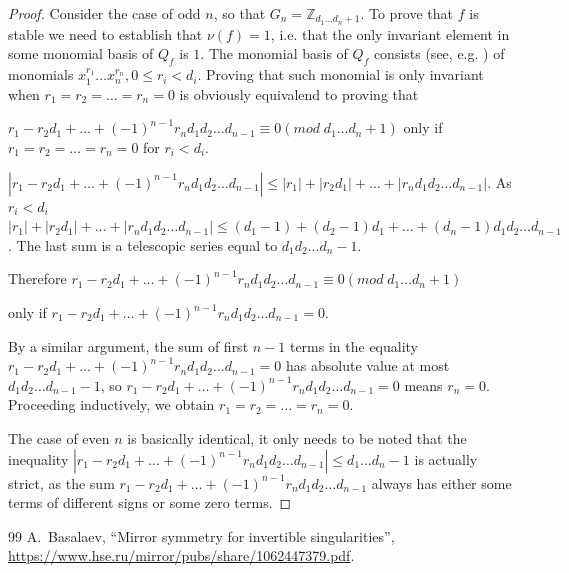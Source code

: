 \documentclass[10pt,a4paper]{amsart}
\begin{document}
\begin{proof}

Consider the case of odd $n$, so that $G_n= \mathbb{Z}_{d_1\ldots d_n + 1}$. To prove that $f$ is stable we need to establish that $\nu(f)=1$, i.e. that the only invariant element in some monomial basis of $Q_f$ is $1$. The monomial basis of $Q_f$ consists (see, e.g. \cite{10}) of monomials $x_1^{r_1}\ldots x_n^{r_n}, 0 \leq r_i < d_i$. Proving that such monomial is only invariant when $r_1 = r_2 = \ldots = r_n =0$ is obviously equivalend to proving that 

$r_1 - r_2 d_1 + \ldots + (-1)^{n-1} r_n d_1 d_2 \ldots d_{n-1} \equiv 0 (mod \; d_1\ldots d_n + 1)$ only if $r_1 = r_2 = \ldots = r_n =0$ for $r_i < d_i$.


 $| r_1 - r_2 d_1 + \ldots + (-1)^{n-1}  r_n d_1 d_2 \ldots d_{n-1} | \leq | r_1| + |r_2 d_1| + \ldots + | r_n d_1 d_2 \ldots d_{n-1} |$. As $r_i < d_i$  $| r_1| + |r_2 d_1| + \ldots + | r_n d_1 d_2 \ldots d_{n-1} | \leq (d_1-1) + (d_2-1)d_1 + \ldots + (d_n - 1) d_1 d_2 \ldots d_{n-1}$. The last sum is a telescopic series equal to $d_1 d_2 \ldots d_n - 1$. 
 
 Therefore $r_1 - r_2 d_1 + \ldots + (-1)^{n-1}  r_n d_1 d_2 \ldots d_{n-1} \equiv 0 (mod \; d_1\ldots d_n + 1)$ 
 
 only if $r_1 - r_2 d_1 + \ldots + (-1)^{n-1}  r_n d_1 d_2 \ldots d_{n-1} = 0$. 
 
 By a similar argument, the sum of first $n-1$ terms in the equality $r_1 - r_2 d_1 + \ldots + (-1)^{n-1}  r_n d_1 d_2 \ldots d_{n-1} = 0$ has absolute value at most $d_1 d_2 \ldots d_{n-1} - 1$, so $r_1 - r_2 d_1 + \ldots + (-1)^{n-1}  r_n d_1 d_2 \ldots d_{n-1} = 0$ means $r_n=0$. Proceeding inductively, we obtain $r_1 = r_2 = \ldots = r_n =0$. 
 
 The case of even $n$ is basically identical, it only needs to be noted that the inequality  $| r_1 - r_2 d_1 + \ldots + (-1)^{n-1}  r_n d_1 d_2 \ldots d_{n-1} | \leq d_1 \ldots d_n -1$ is actually strict, as the sum $r_1 - r_2 d_1 + \ldots + (-1)^{n-1}  r_n d_1 d_2 \ldots d_{n-1}$ always has either some terms of different signs or some zero terms.
\end{proof}

\begin{thebibliography}{99}
 A.~Basalaev, ``Mirror symmetry for invertible singularities'', \url{https://www.hse.ru/mirror/pubs/share/1062447379.pdf}.
\end{thebibliography}
\end{document}
